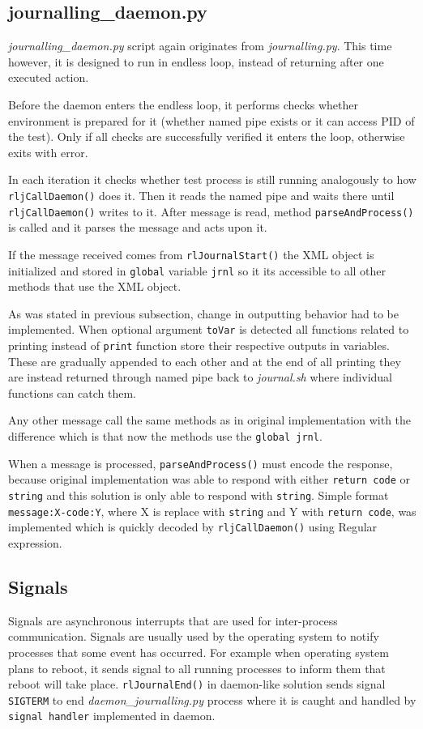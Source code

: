\subsection{journalling\_daemon.py}
\textit{journalling\_daemon.py} script again originates from \textit{journalling.py}. This time however, it is designed to run in endless loop, instead of returning after one executed action.

Before the daemon enters the endless loop, it performs checks whether environment is prepared for it (whether named pipe exists or it can access PID of the test). Only if all checks are successfully verified it enters the loop, otherwise exits with error. 

In each iteration it checks whether test  process is still running analogously to how \texttt{rljCallDaemon()} does it. Then it reads the named pipe and waits there until \\ \texttt{rljCallDaemon()} writes to it. After message is read, method \texttt{parseAndProcess()} is called and it parses the message and acts upon it. 

If the message received comes from \texttt{rlJournalStart()} the XML object is initialized and stored in \texttt{global} variable \texttt{jrnl} so it its accessible to all other methods that use the XML object.

As was stated in previous subsection, change in outputting behavior had to be implemented. When optional argument \texttt{toVar} is detected all functions related to printing instead of \texttt{print} function store their respective outputs in variables. These are gradually appended to each other and at the end of all printing they are instead returned through named pipe back to \textit{journal.sh} where individual functions can catch them.

Any other message call the same methods as in original implementation with the difference which is that now the methods use the \texttt{global jrnl}.

When a message is processed, \texttt{parseAndProcess()} must encode the response, because original implementation was able to respond with either \texttt{return code} or \texttt{string} and this solution is only able to respond with \texttt{string}. Simple format \texttt{message:X-code:Y}, where X is replace with \texttt{string} and Y with \texttt{return code}, was implemented which is quickly decoded by \texttt{rljCallDaemon()} using Regular expression\cite{regex}.

\subsection{Signals}
Signals are asynchronous interrupts that are used for inter-process communication. Signals are usually used by the operating system to notify processes that some event has occurred\cite{signals}. For example when operating system plans to reboot, it sends signal to all running processes to inform them that reboot will take place. \texttt{rlJournalEnd()} in daemon-like solution sends signal \texttt{SIGTERM} to end \textit{daemon\_journalling.py} process where it is caught and handled by \texttt{signal handler} implemented in daemon.

